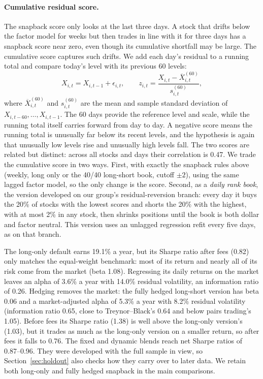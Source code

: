 \documentclass[11pt,letterpaper]{article}
\begin{document}
\paragraph{Cumulative residual score.} The snapback score only looks at the last three days. A stock that drifts below the factor model for weeks but then trades in line with it for three days has a snapback score near zero, even though its cumulative shortfall may be large. The cumulative score captures such drifts. We add each day's residual to a running total and compare today's level with its previous 60 levels:
\[
    X_{i,t} = X_{i,t-1} + \epsilon_{i,t}, \qquad
    z_{i,t} = \frac{X_{i,t} - \overline{X}^{(60)}_{i,t}}{s^{(60)}_{i,t}},
\]
where $\overline{X}^{(60)}_{i,t}$ and $s^{(60)}_{i,t}$ are the mean and sample standard deviation of $X_{i,t-60}, \dots, X_{i,t-1}$. The 60 days provide the reference level and scale, while the running total itself carries forward from day to day. A negative score means the running total is unusually far below its recent levels, and the hypothesis is again that unusually low levels rise and unusually high levels fall. The two scores are related but distinct: across all stocks and days their correlation is 0.47. We trade the cumulative score in two ways. First, with exactly the snapback rules above (weekly, long only or the 40/40 long-short book, cutoff $\pm 2$), using the same lagged factor model, so the only change is the score. Second, as a \emph{daily rank book}, the version developed on our group's residual-reversion branch: every day it buys the 20\% of stocks with the lowest scores and shorts the 20\% with the highest, with at most 2\% in any stock, then shrinks positions until the book is both dollar and factor neutral. This version uses an unlagged regression refit every five days, as on that branch.



The long-only default earns 19.1\% a year, but its Sharpe ratio after fees (0.82) only matches the equal-weight benchmark: most of its return and nearly all of its risk come from the market (beta 1.08). Regressing its daily returns on the market leaves an alpha of 3.6\% a year with 14.0\% residual volatility, an information ratio of 0.26. Hedging removes the market: the fully hedged long-short version has beta 0.06 and a market-adjusted alpha of 5.3\% a year with 8.2\% residual volatility (information ratio 0.65, close to Treynor--Black's 0.64 and below pairs trading's 1.05). Before fees its Sharpe ratio (1.38) is well above the long-only version's (1.03), but it trades as much as the long-only version on a smaller return, so after fees it falls to 0.76. The fixed and dynamic blends reach net Sharpe ratios of 0.87--0.96. They were developed with the full sample in view, so Section~\ref{sec:holdout} also checks how they carry over to later data. We retain both long-only and fully hedged snapback in the main comparisons.
\end{document}
